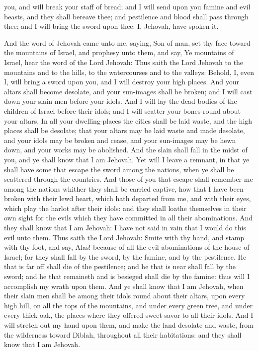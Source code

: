 you, and will break your staff of bread; and I will send upon you famine and evil beasts, and they shall bereave thee; and pestilence and blood shall pass through thee; and I will bring the sword upon thee: I, Jehovah, have spoken it. 

And the word of Jehovah came unto me, saying, Son of man, set thy face toward the mountains of Israel, and prophesy unto them, and say, Ye mountains of Israel, hear the word of the Lord Jehovah: Thus saith the Lord Jehovah to the mountains and to the hills, to the watercourses and to the valleys: Behold, I, even I, will bring a sword upon you, and I will destroy your high places. And your altars shall become desolate, and your sun-images shall be broken; and I will cast down your slain men before your idols. And I will lay the dead bodies of the children of Israel before their idols; and I will scatter your bones round about your altars. In all your dwelling-places the cities shall be laid waste, and the high places shall be desolate; that your altars may be laid waste and made desolate, and your idols may be broken and cease, and your sun-images may be hewn down, and your works may be abolished. And the slain shall fall in the midst of you, and ye shall know that I am Jehovah.  Yet will I leave a remnant, in that ye shall have some that escape the sword among the nations, when ye shall be scattered through the countries. And those of you that escape shall remember me among the nations whither they shall be carried captive, how that I have been broken with their lewd heart, which hath departed from me, and with their eyes, which play the harlot after their idols: and they shall loathe themselves in their own sight for the evils which they have committed in all their abominations. And they shall know that I am Jehovah: I have not said in vain that I would do this evil unto them.  Thus saith the Lord Jehovah: Smite with thy hand, and stamp with thy foot, and say, Alas! because of all the evil abominations of the house of Israel; for they shall fall by the sword, by the famine, and by the pestilence. He that is far off shall die of the pestilence; and he that is near shall fall by the sword; and he that remaineth and is besieged shall die by the famine: thus will I accomplish my wrath upon them. And ye shall know that I am Jehovah, when their slain men shall be among their idols round about their altars, upon every high hill, on all the tops of the mountains, and under every green tree, and under every thick oak, the places where they offered sweet savor to all their idols. And I will stretch out my hand upon them, and make the land desolate and waste, from the wilderness toward Diblah, throughout all their habitations: and they shall know that I am Jehovah. 

